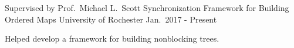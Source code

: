 \begin{cventries}
  \cventry
    {Supervised by Prof.\ Michael L.\ Scott} %
    {Synchronization Framework for Building Ordered Maps} %
    {University of Rochester} %
    {Jan.\ 2017 - Present} %
    {
      \begin{cvitems} %
        \item {Helped develop a framework for building nonblocking trees.}
      \end{cvitems}
    }
\end{cventries}
